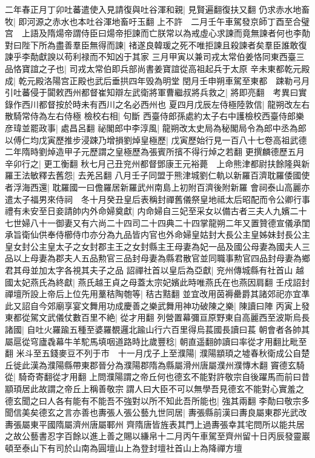 二年春正月丁卯吐蕃遣使入見請復與吐谷渾和親|{
	見賢遍翻復扶又翻}
仍求赤水地畜牧|{
	即河源之赤水也本吐谷渾地畜吁玉翻}
上不許　二月壬午車駕發京師丁酉至合璧宫　上語及隋煬帝謂侍臣曰煬帝拒諫而亡朕常以為戒虛心求諫而竟無諫者何也李勣對曰陛下所為盡善羣臣無得而諫|{
	禇遂良韓瑗之死不唯拒諫且殺諫者矣羣臣誰敢復諫乎李勣獻諛以苟利禄而不知凶于其家}
三月甲寅以兼司戎太常伯姜恪同東西臺三品恪寶誼之子也|{
	司戎太常伯即兵部尚書姜寶誼從高祖起兵于太原}
辛未東都乾元殿成|{
	乾元殿洛陽宫正殿也武后垂拱四年毁為明堂}
閏月壬申朔車駕至東都　踈勒弓月引吐蕃侵于闐敕西州都督崔知辯左武衛將軍曹繼叔將兵救之|{
	將即亮翻　考異曰實錄作西川都督按於時未有西川之名必西州也}
夏四月戊辰左侍極陸敦信|{
	龍朔改左右散騎常侍為左右侍極}
檢校右相|{
	句斷}
西臺侍郎孫處約太子右中護檢校西臺侍郎樂彦瑋並罷政事|{
	處昌呂翻}
祕閣郎中李淳風|{
	龍朔改太史局為秘閣局令為郎中丞為郎}
以傅仁均戊寅歷推步浸踈乃增損劉焯皇極歷|{
	戊寅歷始行見一百八十七卷高祖武德二年隋時劉焯造甲子元歷謂之皇極歷為張賓所擯不得行焯之若翻}
更撰麟德歷五月辛卯行之|{
	更工衡翻}
秋七月己丑兖州都督鄧康王元裕薨　上命熊津都尉扶餘隆與新羅王法敏釋去舊怨|{
	去羌呂翻}
八月壬子同盟于熊津城劉仁軌以新羅百濟耽羅倭國使者浮海西還|{
	耽羅國一曰儋羅居新羅武州南島上初附百濟後附新羅}
會祠泰山高麗亦遣太子福男來侍祠　冬十月癸丑皇后表稱封禪舊儀祭皇地祗太后昭配而令公卿行事禮有未安至日妾請帥内外命婦奠獻|{
	内命婦自三妃至采女以備古者三夫人九嬪二十七世婦八十一御妻又有六尚二十四司二十四典二十四掌龍朔二年又置贊德宣儀承閨承旨衛仙供奉侍櫛侍巾亦分為九品皆内官也外命婦皇姑封大長公主皇姊妹封長公主皇女封公主皇太子之女封郡主王之女封縣主王母妻為妃一品及國公母妻為國夫人三品以上母妻為郡夫人五品勲官三品封母妻為縣君散官並同職事勲官四品封母妻為鄉君其母並加太字各視其夫子之品}
詔禪社首以皇后為亞獻|{
	兖州傳城縣有社首山}
越國太妃燕氏為終獻|{
	燕氏越王貞之母蓋太宗妃嬪此時唯燕氏在也燕因肩翻}
壬戍詔封禪壇所設上帝后上位先用藳秸陶匏等|{
	秸古黠翻}
並宜改用茵褥罍爵其諸郊祀亦宜凖此又詔自今郊廟享宴文舞用功成慶善之樂武舞用神功破陳之樂|{
	陳讀曰陣}
丙寅上發東都從駕文武儀仗數百里不絶|{
	從才用翻}
列營置幕彌亘原野東自高麗西至波斯烏長諸國|{
	自吐火羅踰五種至婆羅覩邏北踰山行六百里得烏萇國長讀曰萇}
朝會者各帥其屬扈從穹廬毳幕牛羊駝馬填咽道路時比歲豐稔|{
	朝直遥翻帥讀曰率從才用翻比毗至翻}
米斗至五錢麥豆不列于市　十一月戊子上至濮陽|{
	濮陽顓頊之墟春秋衛成公自楚丘徙此漢為濮陽縣帶東郡晉分為濮陽郡隋為縣屬滑州唐屬濮州濮慱木翻}
竇德玄騎從|{
	騎奇寄翻從才用翻}
上問濮陽謂之帝丘何也德玄不能對許敬宗自後躍馬而前曰昔顓頊居此故謂之帝丘上稱善敬宗謂人曰大臣不可以無學吾見德玄不能對心實羞之德玄聞之曰人各有能有不能吾不強對以所不知此吾所能也|{
	強其兩翻}
李勣曰敬宗多聞信美矣德玄之言亦善也夀張人張公藝九世同居|{
	夀張縣前漢曰夀良屬東郡光武改夀張屬東平國隋屬濟州唐屬鄆州}
齊隋唐皆旌表其門上過夀張幸其宅問所以能共居之故公藝書忍字百餘以進上善之賜以縑帛十二月丙午車駕至齊州留十日丙辰發靈巖頓至泰山下有司於山南為圓壇山上為登封壇社首山上為降禪方壇

